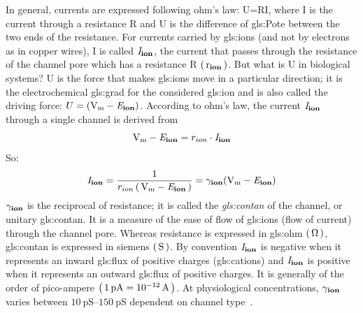 \documentclass[class={myRUCProject}, crop=false]{standalone}
\begin{document}
In general, currents are expressed following ohm's law: U=RI, where I is the current through a resistance R and U is the difference of \gls{gls:Pote} between the two ends of the resistance. For currents carried by \glspl{gls:ion} (and not by electrons as in copper wires), I is called \(\mathit{I}_\mathbf{ion}\), the current that passes through the resistance of the channel pore which has a resistance R \(\left(\,\mathrm{r}_\mathbf{ion}\,\right)\). But what is U in biological systems? U is the force that makes \glspl{gls:ion} move in a particular direction; it is the electrochemical \gls{gls:grad} for the considered \gls{gls:ion} and is also called the driving force: \(U=(\unit{\V\membrane} - \equi\ion)\). According to ohm's law, the current \(\mathit{I}_\mathbf{ion}\) through a single channel is derived from 
\begin{equation}
  \unit{\V\membrane} - \equi\ion = r_{ion} \cdot \curr\ion
\end{equation}
So:
\begin{equation}
  \curr\ion= \frac{1}{r_{ion}\br{\unit{\V\membrane} - \equi\ion}} = \uncon\ion(\unit{\V\membrane} - \equi\ion)
\end{equation}
\(\gamma_\mathbf{ion}\) is the reciprocal of resistance; it is called the \textit{\gls{gls:contan}} of the channel, or unitary \gls{gls:contan}. It is a measure of the ease of flow of \glspl{gls:ion} (flow of current) through the channel pore. Whereas resistance is expressed in \gls{gls:ohm} \(\br{\unit{\ohm}}\), \gls{gls:contan} is expressed in siemens \(\br{\unit{\siemens}}\). By convention \(\mathit{I}_\mathbf{ion}\) is negative when it represents an inward \gls{gls:flux} of positive charges (\glspl{gls:cation}) and \(\mathit{I}_\mathbf{ion}\) is positive when it represents an outward \gls{gls:flux} of positive charges. It is generally of the order of pico-ampere \(\br{\qty{1}{\pico\ampere}=\qty{e-12}{\ampere}}\). At physiological concentrations, \(\gamma_\mathbf{ion}\) varies between \(\qtyrange{10}{150}{\pico\siemens}\) dependent on channel type~\cite{}.
\end{document}
